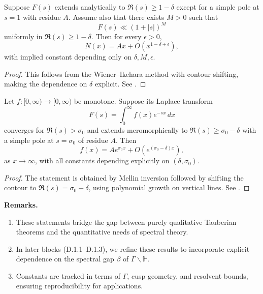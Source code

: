 \medskip

\begin{lemma}\label{lem:ikehara-effective}
Suppose $F(s)$ extends analytically to $\Re(s)\ge 1-\delta$ except for a simple pole at $s=1$ with residue $A$.  
Assume also that there exists $M>0$ such that
\[
F(s) \ll (1+|s|)^M
\]
uniformly in $\Re(s)\ge 1-\delta$. Then for every $\epsilon>0$,
\[
N(x) = A x + O(x^{1-\delta+\epsilon}),
\]
with implied constant depending only on $\delta, M, \epsilon$.  
\end{lemma}

\begin{proof}
This follows from the Wiener–Ikehara method with contour shifting, making the dependence on $\delta$ explicit. See \cite[Thm.~II.7.11]{Delange1954}.
\end{proof}

\medskip

\begin{proposition}\label{prop:laplace-tauber}
Let $f:[0,\infty)\to [0,\infty)$ be monotone. Suppose its Laplace transform
\[
F(s) = \int_0^\infty f(x) e^{-s x}\, dx
\]
converges for $\Re(s) > \sigma_0$ and extends meromorphically to $\Re(s)\ge \sigma_0-\delta$ with a simple pole at $s=\sigma_0$ of residue $A$. Then
\[
f(x) = A e^{\sigma_0 x} + O(e^{(\sigma_0-\delta) x}),
\]
as $x\to \infty$, with all constants depending explicitly on $(\delta, \sigma_0)$.
\end{proposition}

\begin{proof}
The statement is obtained by Mellin inversion followed by shifting the contour to $\Re(s)=\sigma_0-\delta$, using polynomial growth on vertical lines.  
See \cite{Ingham1935, Korevaar2004}.
\end{proof}

\medskip

\noindent \textbf{Remarks.}  
\begin{enumerate}
  \item These statements bridge the gap between purely qualitative Tauberian theorems and the quantitative needs of spectral theory.  
  \item In later blocks (D.1.1–D.1.3), we refine these results to incorporate explicit dependence on the spectral gap $\beta$ of $\Gamma \backslash \mathbb H$.  
  \item Constants are tracked in terms of $\Gamma$, cusp geometry, and resolvent bounds, ensuring reproducibility for applications.  
\end{enumerate}

